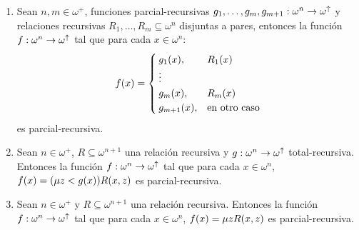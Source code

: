\begin{theorem}
\begin{enumerate}
		\item Sean $n, m\in\omega^{+}$, funciones parcial-recursivas $g_{1},\dotsc, g_{m}, g_{m + 1}:\omega^{n}\to\omega^{\uparrow}$ y relaciones recursivas $R_{1},\dotsc, R_{m}\subseteq\omega^{n}$ disjuntas a pares, entonces la función $f:\omega^{n}\to\omega^{\uparrow}$ tal que para cada $x\in\omega^{n}$:
		\[
			f\pa*{x} =
			\begin{cases}
				g_{1}\pa*{x}, & R_{1}\pa*{x}\\
				\vdots\\
				g_{m}\pa*{x}, & R_{m}\pa*{x}\\
				g_{m + 1}\pa*{x}, &\text{en otro caso}
			\end{cases}
		\]
		es parcial-recursiva.

		\item Sean $n\in\omega^{+}$, $R\subseteq\omega^{n + 1}$ una relación recursiva y $g:\omega^{n}\to\omega^{\uparrow}$ total-recursiva. Entonces la función $f:\omega^{n}\to\omega^{\uparrow}$ tal que para cada $x\in\omega^{n}$, $f\pa*{x} =\pa*{\mu z < g\pa*{x}}R\pa*{x, z}$ es parcial-recursiva.

		\item Sean $n\in\omega^{+}$ y $R\subseteq\omega^{n + 1}$ una relación recursiva. Entonces la función $f:\omega^{n}\to\omega^{\uparrow}$ tal que para cada $x\in\omega^{n}$, $f\pa*{x} =\mu zR\pa*{x, z}$ es parcial-recursiva.
	\end{enumerate}
\end{theorem}

